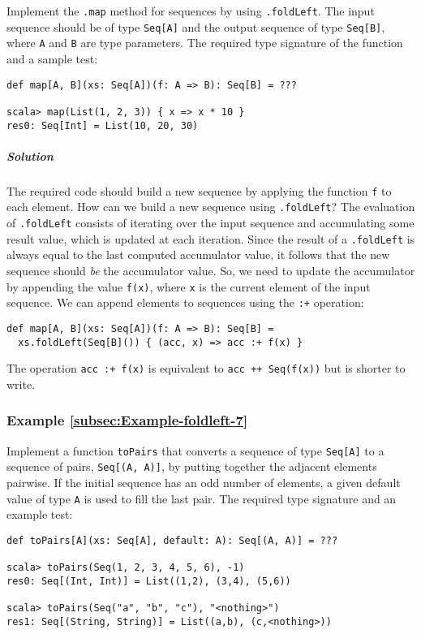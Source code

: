 Implement the \lstinline!.map! method for sequences by using \lstinline!.foldLeft!.
The input sequence should be of type \lstinline!Seq[A]! and the output
sequence of type \lstinline!Seq[B]!, where \lstinline!A! and \lstinline!B!
are type parameters. The required type signature of the function and
a sample test:
\begin{lstlisting}
def map[A, B](xs: Seq[A])(f: A => B): Seq[B] = ???

scala> map(List(1, 2, 3)) { x => x * 10 }
res0: Seq[Int] = List(10, 20, 30)
\end{lstlisting}


\subparagraph{Solution}

The required code should build a new sequence by applying the function
\lstinline!f! to each element. How can we build a new sequence using
\lstinline!.foldLeft!? The evaluation of \lstinline!.foldLeft! consists
of iterating over the input sequence and accumulating some result
value, which is updated at each iteration. Since the result of a \lstinline!.foldLeft!
is always equal to the last computed accumulator value, it follows
that the new sequence should \emph{be} the accumulator value. So,
we need to update the accumulator by appending the value \lstinline!f(x)!,
where \lstinline!x! is the current element of the input sequence.
We can append elements to sequences using the \lstinline!:+! operation:
\begin{lstlisting}
def map[A, B](xs: Seq[A])(f: A => B): Seq[B] =
  xs.foldLeft(Seq[B]()) { (acc, x) => acc :+ f(x) }
\end{lstlisting}
The operation \lstinline!acc :+ f(x)! is equivalent to \lstinline!acc ++ Seq(f(x))!
but is shorter to write.

\subsubsection{Example \label{subsec:Example-foldleft-7}\ref{subsec:Example-foldleft-7}}

Implement a function \lstinline!toPairs! that converts a sequence
of type \lstinline!Seq[A]! to a sequence of pairs, \lstinline!Seq[(A, A)]!,
by putting together the adjacent elements pairwise. If the initial
sequence has an odd number of elements, a given default value of type
\lstinline!A! is used to fill the last pair. The required type signature
and an example test:
\begin{lstlisting}
def toPairs[A](xs: Seq[A], default: A): Seq[(A, A)] = ???

scala> toPairs(Seq(1, 2, 3, 4, 5, 6), -1)
res0: Seq[(Int, Int)] = List((1,2), (3,4), (5,6))

scala> toPairs(Seq("a", "b", "c"), "<nothing>")
res1: Seq[(String, String)] = List((a,b), (c,<nothing>)) 
\end{lstlisting}


